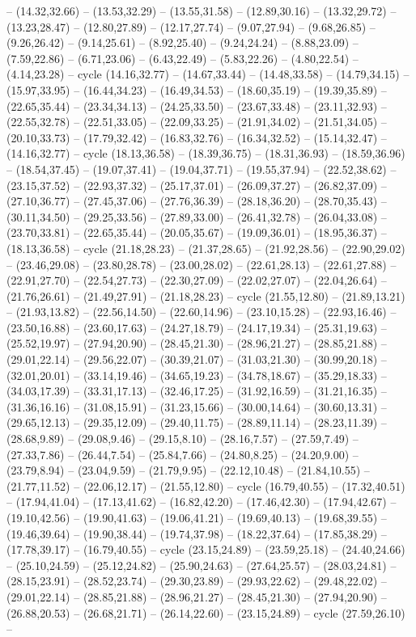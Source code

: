 {-- (14.32,32.66) -- (13.53,32.29) -- (13.55,31.58) -- (12.89,30.16) -- (13.32,29.72) -- (13.23,28.47) -- (12.80,27.89) -- (12.17,27.74) -- (9.07,27.94) -- (9.68,26.85) -- (9.26,26.42) -- (9.14,25.61) -- (8.92,25.40) -- (9.24,24.24) -- (8.88,23.09) -- (7.59,22.86) -- (6.71,23.06) -- (6.43,22.49) -- (5.83,22.26) -- (4.80,22.54) -- (4.14,23.28) -- cycle (14.16,32.77) -- (14.67,33.44) -- (14.48,33.58) -- (14.79,34.15) -- (15.97,33.95) -- (16.44,34.23) -- (16.49,34.53) -- (18.60,35.19) -- (19.39,35.89) -- (22.65,35.44) -- (23.34,34.13) -- (24.25,33.50) -- (23.67,33.48) -- (23.11,32.93) -- (22.55,32.78) -- (22.51,33.05) -- (22.09,33.25) -- (21.91,34.02) -- (21.51,34.05) -- (20.10,33.73) -- (17.79,32.42) -- (16.83,32.76) -- (16.34,32.52) -- (15.14,32.47) -- (14.16,32.77) -- cycle (18.13,36.58) -- (18.39,36.75) -- (18.31,36.93) -- (18.59,36.96) -- (18.54,37.45) -- (19.07,37.41) -- (19.04,37.71) -- (19.55,37.94) -- (22.52,38.62) -- (23.15,37.52) -- (22.93,37.32) -- (25.17,37.01) -- (26.09,37.27) -- (26.82,37.09) -- (27.10,36.77) -- (27.45,37.06) -- (27.76,36.39) -- (28.18,36.20) -- (28.70,35.43) -- (30.11,34.50) -- (29.25,33.56) -- (27.89,33.00) -- (26.41,32.78) -- (26.04,33.08) -- (23.70,33.81) -- (22.65,35.44) -- (20.05,35.67) -- (19.09,36.01) -- (18.95,36.37) -- (18.13,36.58) -- cycle (21.18,28.23) -- (21.37,28.65) -- (21.92,28.56) -- (22.90,29.02) -- (23.46,29.08) -- (23.80,28.78) -- (23.00,28.02) -- (22.61,28.13) -- (22.61,27.88) -- (22.91,27.70) -- (22.54,27.73) -- (22.30,27.09) -- (22.02,27.07) -- (22.04,26.64) -- (21.76,26.61) -- (21.49,27.91) -- (21.18,28.23) -- cycle (21.55,12.80) -- (21.89,13.21) -- (21.93,13.82) -- (22.56,14.50) -- (22.60,14.96) -- (23.10,15.28) -- (22.93,16.46) -- (23.50,16.88) -- (23.60,17.63) -- (24.27,18.79) -- (24.17,19.34) -- (25.31,19.63) -- (25.52,19.97) -- (27.94,20.90) -- (28.45,21.30) -- (28.96,21.27) -- (28.85,21.88) -- (29.01,22.14) -- (29.56,22.07) -- (30.39,21.07) -- (31.03,21.30) -- (30.99,20.18) -- (32.01,20.01) -- (33.14,19.46) -- (34.65,19.23) -- (34.78,18.67) -- (35.29,18.33) -- (34.03,17.39) -- (33.31,17.13) -- (32.46,17.25) -- (31.92,16.59) -- (31.21,16.35) -- (31.36,16.16) -- (31.08,15.91) -- (31.23,15.66) -- (30.00,14.64) -- (30.60,13.31) -- (29.65,12.13) -- (29.35,12.09) -- (29.40,11.75) -- (28.89,11.14) -- (28.23,11.39) -- (28.68,9.89) -- (29.08,9.46) -- (29.15,8.10) -- (28.16,7.57) -- (27.59,7.49) -- (27.33,7.86) -- (26.44,7.54) -- (25.84,7.66) -- (24.80,8.25) -- (24.20,9.00) -- (23.79,8.94) -- (23.04,9.59) -- (21.79,9.95) -- (22.12,10.48) -- (21.84,10.55) -- (21.77,11.52) -- (22.06,12.17) -- (21.55,12.80) -- cycle (16.79,40.55) -- (17.32,40.51) -- (17.94,41.04) -- (17.13,41.62) -- (16.82,42.20) -- (17.46,42.30) -- (17.94,42.67) -- (19.10,42.56) -- (19.90,41.63) -- (19.06,41.21) -- (19.69,40.13) -- (19.68,39.55) -- (19.46,39.64) -- (19.90,38.44) -- (19.74,37.98) -- (18.22,37.64) -- (17.85,38.29) -- (17.78,39.17) -- (16.79,40.55) -- cycle (23.15,24.89) -- (23.59,25.18) -- (24.40,24.66) -- (25.10,24.59) -- (25.12,24.82) -- (25.90,24.63) -- (27.64,25.57) -- (28.03,24.81) -- (28.15,23.91) -- (28.52,23.74) -- (29.30,23.89) -- (29.93,22.62) -- (29.48,22.02) -- (29.01,22.14) -- (28.85,21.88) -- (28.96,21.27) -- (28.45,21.30) -- (27.94,20.90) -- (26.88,20.53) -- (26.68,21.71) -- (26.14,22.60) -- (23.15,24.89) -- cycle (27.59,26.10) -- }
